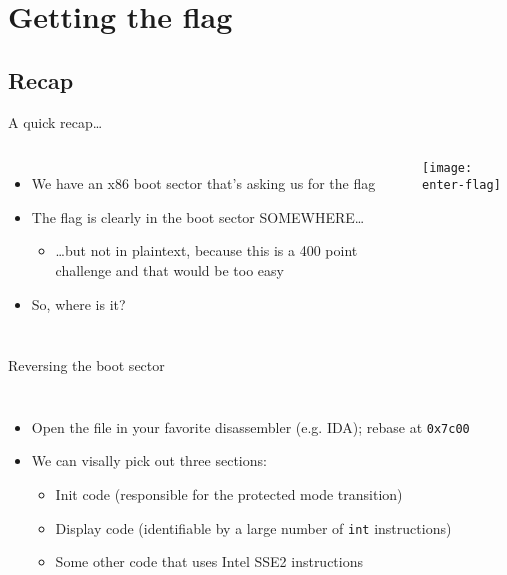
\section{Getting the flag}

\subsection{Recap}

\begin{frame}{A quick recap\ldots}
    \begin{columns}
        \begin{itemize}
            \item<1-> We have an x86 boot sector that's asking us for the flag
            \item<2-> The flag is clearly in the boot sector SOMEWHERE\ldots
            \begin{itemize}
                \item<3-> \ldots but not in plaintext, because this is a 400
                          point challenge and that would be too easy
            \end{itemize}
            \item<4-> So, where is it?
        \end{itemize}
        \texttt{[image: enter-flag]}
    \end{columns}
\end{frame}

\begin{frame}{Reversing the boot sector}
    \begin{columns}
        \begin{itemize}
            \item<1-> Open the file in your favorite disassembler (e.g. IDA);
                      rebase at \texttt{0x7c00}
            \item<2-> We can visally pick out three sections:
            \begin{itemize}
                \item<2-> Init code (responsible for the protected
                          mode transition)
                \item<2-> Display code (identifiable by a large number of
                          \texttt{int} instructions)
                \item<2-> Some other code that uses Intel SSE2 instructions
            \end{itemize}
        \end{itemize}
    \end{columns}
\end{frame}

